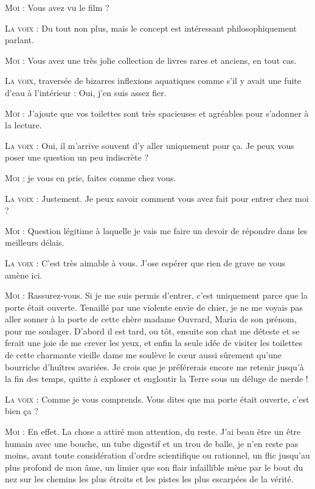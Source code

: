 \begin{dialogue}
\textsc{Moi} : Vous avez vu le film ?

\textsc{La voix} : Du tout non plus, mais le concept est intéressant philosophiquement parlant.

\textsc{Moi} : Vous avez une très jolie collection de livres rares et anciens, en tout cas.

\textsc{La voix}, traversée de bizarres inflexions aquatiques comme s’il y avait une fuite d’eau à l’intérieur : Oui, j’en suis assez fier.

\textsc{Moi} : J’ajoute que vos toilettes sont très spacieuses et agréables pour s’adonner à la lecture.

\textsc{La voix} : Oui, il m’arrive souvent d’y aller uniquement pour ça. Je peux vous poser une question un peu indiscrète ?

\textsc{Moi} : je vous en prie, faites comme chez vous.

\textsc{La voix} : Justement. Je peux savoir comment vous avez fait pour entrer chez moi ?

\textsc{Moi} : Question légitime à laquelle je vais me faire un devoir de répondre dans les meilleurs délais.

\textsc{La voix} : C’est très aimable à vous. J’ose espérer que rien de grave ne vous amène ici.

\textsc{Moi} : Rassurez-vous. Si je me suis permis d’entrer, c’est uniquement parce que la porte était ouverte. Tenaillé par une violente envie de chier, je ne me voyais pas aller sonner à la porte de cette chère madame Ouvrard, Maria de son prénom, pour me soulager. D’abord il est tard, ou tôt, ensuite son chat me déteste et se ferait une joie de me crever les yeux, et enfin la seule idée de visiter les toilettes de cette charmante vieille dame me soulève le cœur aussi sûrement qu’une bourriche d’huîtres avariées. Je crois que je préférerais encore me retenir jusqu’à la fin des temps, quitte à exploser et engloutir la Terre sous un déluge de merde !

\textsc{La voix} : Comme je vous comprends. Vous dites que ma porte était ouverte, c’est bien ça ?

\textsc{Moi} : En effet. La chose a attiré mon attention, du reste. J’ai beau être un être humain avec une bouche, un tube digestif et un trou de balle, je n’en reste pas moins, avant toute considération d’ordre scientifique ou rationnel, un flic jusqu’au plus profond de mon âme, un limier que son flair infaillible mène par le bout du nez sur les chemins les plus étroits et les pistes les plus escarpées de la vérité.


\end{dialogue}
